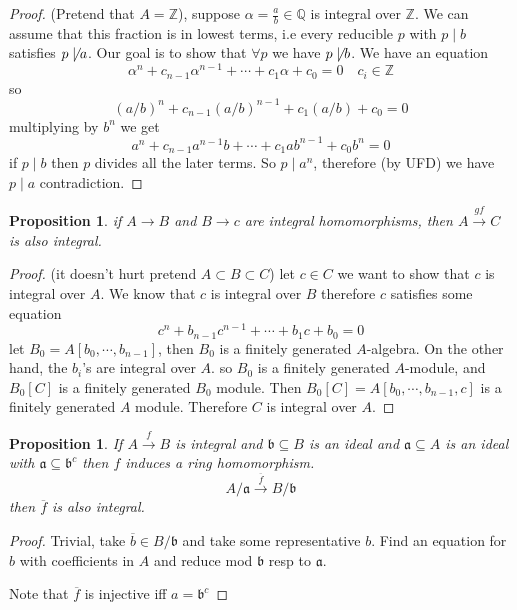 \documentclass[11pt,a4paper]{article}
\theoremstyle{definition}
\theoremstyle{plain}
\newtheorem{proposition}[definition]{Proposition}
\theoremstyle{remark}
\newcommand{\Z}{\mathbb{Z}}
\newcommand{\Q}{\mathbb{Q}}
\begin{document}
\begin{proof}
    (Pretend that $A = \Z$), suppose $\alpha = \frac{a}{b} \in \Q$ is integral over $\Z$. We can assume that 
    this fraction is in lowest terms, i.e every reducible $p$ with $p \mid b$ satisfies $p \not\mid a$. 
    Our goal is to show that $\forall p$ we have $p \not\mid b$. We have an equation 
    $$\alpha^n + c_{n-1} \alpha^{n-1} + \cdots + c_1 \alpha + c_0 = 0 \quad c_i \in \Z$$
    so 
    $$(a/b)^n + c_{n-1} (a/b)^{n-1} + c_1 (a/b) + c_0 = 0$$
    multiplying by $b^n$ we get 
    $$a^n + c_{n-1} a^{n-1} b + \cdots + c_1 ab^{n-1} + c_0 b^n = 0$$
    if $p \mid b$ then $p$ divides all the later terms. So $p \mid a^n$, therefore (by UFD) we have 
    $p \mid a$ contradiction. 
\end{proof}

\begin{proposition}
    if $A \to B$ and $B \to c$ are integral homomorphisms, then $A \xrightarrow{gf} C$ is also integral. 
\end{proposition}

\begin{proof}
    (it doesn't hurt pretend $A \subset B \subset C$) let $c \in C$ we want to show that $c$ is integral over $A$. We know that 
    $c$ is integral over $B$ therefore $c$ satisfies some equation 
    $$c^n + b_{n-1} c^{n-1} + \cdots + b_1 c + b_0 = 0$$
    let $B_0 = A[b_0, \cdots, b_{n-1}]$, then $B_0$ is a finitely generated $A$-algebra. On the other hand, the $b_i$'s are integral over $A$. 
    so $B_0$ is a finitely generated $A$-module, and 
    $B_0[C]$ is a finitely generated $B_0$ module. Then $B_0[C] = A[b_0, \cdots, b_{n-1}, c]$ is a finitely generated $A$ module. 
    Therefore $C$ is integral over $A$.  
\end{proof}

\begin{proposition}
    If $A \xrightarrow{f} B$ is integral and $\mathfrak{b} \subseteq B$ is an ideal and $\mathfrak{a} \subseteq A$ is 
    an ideal with $\mathfrak{a} \subseteq \mathfrak{b}^c$ then $f$ induces a ring homomorphism. 
    $$A / \mathfrak{a} \xrightarrow{\overline{f}} B / \mathfrak{b}$$
    then $\overline{f}$ is also integral.
\end{proposition}

\begin{proof}
    Trivial, take $\overline{b} \in B / \mathfrak{b}$ and take some representative $b$. Find an equation for $b$ with coefficients in $A$ and reduce 
    mod $\mathfrak{b}$ resp to $\mathfrak{a}$. 

    Note that $\overline{f}$ is injective iff $a = \mathfrak{b}^c$
\end{proof}
\end{document}
